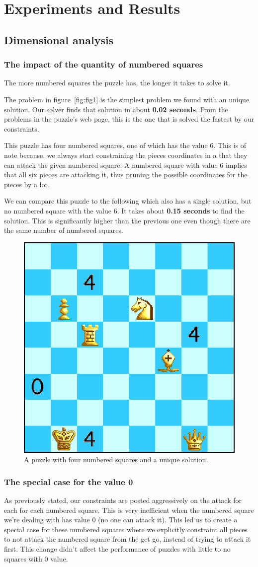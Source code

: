 \documentclass[runningheads]{llncs}
\begin{document}
\section{Experiments and Results}
\subsection{Dimensional analysis}
\subsubsection{The impact of the quantity of numbered squares}
The more numbered squares the puzzle has, the longer it takes to solve it.

The problem in figure~\ref{fig:fig1} is the simplest problem we found with
an unique solution. Our solver finds that solution in about \textbf{0.02 seconds}.
From the problems in the puzzle's web page, this is the one that is solved
the fastest by our constraints.

This puzzle has four numbered squares, one of which has the value 6. This
is of note because, we always start constraining the pieces coordinates
in a that they can attack the given numbered square. A numbered square with
value 6 implies that all six pieces are attacking it, thus pruning the
possible coordinates for the pieces by a lot.

We can compare this puzzle to the following which also has a single solution,
but no numbered square with the value 6. It takes about \textbf{0.15 seconds} to
find the solution. This is significantly higher than the previous one
even though there are the same number of numbered squares.

\begin{figure}[H]
  \centering
  \includegraphics[width=0.4\linewidth]{figures/chess2.eps}
  \caption{A puzzle with four numbered squares and a unique solution.}\label{fig:fig4}
\end{figure}

\subsubsection{The special case for the value 0}
As previously stated, our constraints are posted aggressively on the attack
for each for each numbered square. This is very inefficient when the numbered
square we're dealing with has value 0 (no one can attack it). This led us to
create a special case for these numbered squares where we explicitly constraint
all pieces to not attack the numbered square from the get go, instead of
trying to attack it first. This change didn't affect the performance of puzzles
with little to no squares with 0 value.
\end{document}

